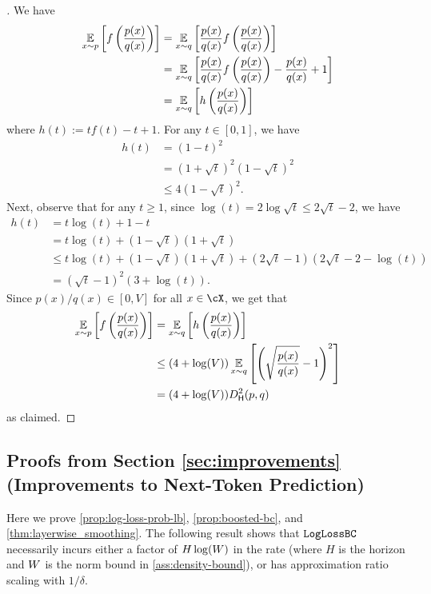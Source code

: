 \begin{proof}[]
We have
\begin{align}
\operatorname*{\mathbb{E}}_{x \sim p} \left[f\left(\frac{p(x)}{q(x)}\right)\right]
&= \operatorname*{\mathbb{E}}_{x \sim q} \left[\frac{p(x)}{q(x)} f\left(\frac{p(x)}{q(x)}\right)\right] \\ 
&= \operatorname*{\mathbb{E}}_{x \sim q} \left[\frac{p(x)}{q(x)} f\left(\frac{p(x)}{q(x)}\right) - \frac{p(x)}{q(x)} + 1\right] \\ 
&= \operatorname*{\mathbb{E}}_{x \sim q} \left[h\left(\frac{p(x)}{q(x)}\right)\right]
\end{align}
where $h(t) := tf(t) - t + 1$. For any $t \in [0,1]$, we have
\begin{align}
h(t)
&= (1 - t)^2 \\ 
&= (1 + \sqrt{t})^2 (1 - \sqrt{t})^2 \\ 
&\leq 4 (1 - \sqrt{t})^2.
\end{align}
Next, observe that for any $t \geq 1$, since $\log(t) = 2\log\sqrt{t} \leq 2\sqrt{t}-2$, we have
\begin{align}
h(t)
&= t\log(t) + 1 - t \\ 
&= t\log(t) + (1-\sqrt{t})(1+\sqrt{t}) \\ 
&\leq t\log(t) + (1-\sqrt{t})(1+\sqrt{t}) + (2\sqrt{t}-1)(2\sqrt{t}-2-\log(t)) \\ 
&= (\sqrt{t} - 1)^2(3 + \log(t)).
\end{align}
Since $p(x)/q(x) \in [0,V]$ for all $x \in \cX$, we get that
\begin{align}
\EE_{x \sim p} \left[f\left(\frac{p(x)}{q(x)}\right)\right] 
&= \EE_{x \sim q} \left[h\left(\frac{p(x)}{q(x)}\right)\right] \\
&\leq (4 + \log(V))\EE_{x \sim q} \left[\left(\sqrt{\frac{p(x)}{q(x)}} - 1\right)^2\right] \\ 
&= (4 + \log(V)) \Dhels{p}{q}
\end{align}
as claimed.
\end{proof}



  \subsection{Proofs from Section \ref*{sec:improvements} (Improvements
    to Next-Token Prediction)}\label{sec:improvements-app}



Here we prove \cref{prop:log-loss-prob-lb}, \cref{prop:boosted-bc}, and \cref{thm:layerwise_smoothing}. The following result shows that $\texttt{LogLossBC}$ necessarily incurs either a factor of $H\log(W)$ in the rate (where $H$ is the horizon and $W$ is the norm bound in \cref{ass:density-bound}), or has approximation ratio scaling with $1/\delta$.

